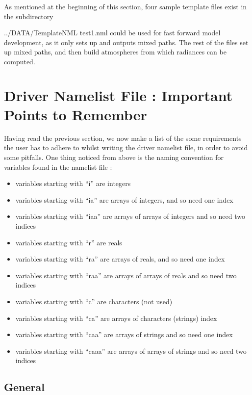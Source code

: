\documentclass[12pt]{article}
\begin{document}
{{As mentioned at the beginning of this section, four sample template files 
exist in the subdirectory {\sf ../DATA/TemplateNML
test1.nml could be used for fast forward model development, as it only sets 
up and outputs mixed paths.  The rest of the files set up mixed paths, and 
then build atmospheres from which radiances can be computed.

\section{Driver Namelist File : Important Points to Remember}

Having read the previous section, we now make a list of the some requirements
the user has to adhere to whilst writing the driver namelist file, in order 
to avoid  some pitfalls. One thing noticed from above is the naming 
convention for variables found in the namelist file : 
\begin{itemize}
\item variables starting with ``i'' are integers
\item variables starting with ``ia'' are arrays of integers, and so need one
        index
\item variables starting with ``iaa'' are arrays of arrays of integers and so
        need two indices

\item variables starting with ``r'' are reals
\item variables starting with ``ra'' are arrays of reals, and so need one
        index
\item variables starting with ``raa'' are arrays of arrays of reals and so
        need two indices

\item variables starting with ``c'' are characters (not used)
\item variables starting with ``ca'' are arrays of characters (strings)
        index
\item variables starting with ``caa'' are arrays of strings and so need one 
      index
\item variables starting with ``caaa'' are arrays of arrays of strings and so 
      need two indices
\end{itemize}

\subsection{General}
\begin{itemize}


\end{itemize}}}}
\end{document}
